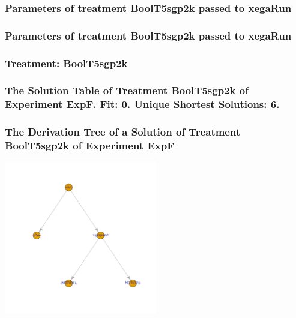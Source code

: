 \documentclass[18pt,c]{beamer}
\begin{document}

 \begin{frame}
 \fontsize{8pt}{9pt}\selectfont
 \frametitle{  Parameters of treatment BoolT5sgp2k passed to xegaRun
 }

 \label{ExpFtParmTable014.tex}  
 \end{frame}


 \begin{frame}
 \fontsize{8pt}{9pt}\selectfont
 \frametitle{  Parameters of treatment BoolT5sgp2k passed to xegaRun
 }

 \label{ExpFtParmTable015.tex}  
 \end{frame}

 \begin{frame}
 \fontsize{8pt}{9pt}\selectfont
 \frametitle{ Treatment: BoolT5sgp2k }

 \label{ExpFStatsTable009.tex}  
 \end{frame}

 \begin{frame}
 \fontsize{8pt}{9pt}\selectfont
 \frametitle{ The Solution Table of Treatment BoolT5sgp2k of Experiment ExpF. Fit: 0. Unique Shortest Solutions: 6. }

 \label{ExpFSolutionTable003.tex}  
 \end{frame}

 \begin{frame}
 \frametitle{ The Derivation Tree of a Solution of Treatment BoolT5sgp2k of Experiment ExpF }
 \begin{center}
\includegraphics[width=0.5\textwidth, angle=0]
{ExpFDerivationTreeFigure003.pdf}
 \end{center}
 \label{report/ExpFDerivationTreeFigure003.pdf}  
 \end{frame}
\end{document}
